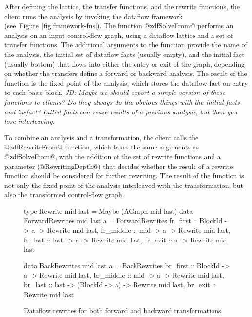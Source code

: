 \documentclass[blockstyle,preprint,nocopyrightspace]{sigplanconf}
\newcommand{\authornote}[1]{{\em #1}}
\newcommand{\john}[1]{\authornote{JD: #1}}
\newcommand\figref[1]{Figure~\ref{fig:#1}}
\newcommand\figlabel[1]{\label{fig:#1}}
\begin{document}
After defining the lattice, the transfer functions, and the rewrite functions,
the client runs the analysis by invoking the dataflow framework
(see~\figref{framework-fns}).
The function @zdfSolveFrom@ performs an analysis on an input control-flow graph,
using a dataflow lattice and a set of transfer functions.
The additional arguments to the function provide
the name of the analysis,
the initial set of dataflow facts (usually empty),
and the initial fact (usually bottom)
that flows into either the entry or exit of the graph,
depending on whether the transfers define a forward or backward analysis.
The result of the function is the fixed point of the analysis,
which stores the dataflow fact on entry to each basic block.
\john{Maybe we should export a simple version of these functions to clients?
  Do they always do the obvious things with the initial facts and in-fact?
  Initial facts can reuse results of a previous analysis, but then you lose
  interleaving.}

To combine an analysis and a transformation,
the client calls the @zdfRewriteFrom@ function,
which takes the same arguments as @zdfSolveFrom@,
with the addition of the set of rewrite functions
and a parameter (@RewritingDepth@) that decides whether the result
of a rewrite function should be considered for further rewriting.
The result of the function is not only the fixed point of the
analysis interleaved with the transformation,
but also the transformed control-flow graph.

\begin{figure}
\begin{code}
type Rewrite mid last = Maybe (AGraph mid last)
data ForwardRewrites mid last a = ForwardRewrites
 {fr_first  :: BlockId -> a -> Rewrite mid last,
  fr_middle :: mid     -> a -> Rewrite mid last,
  fr_last   :: last    -> a -> Rewrite mid last,
  fr_exit   ::            a -> Rewrite mid last} 

data BackRewrites mid last a = BackRewrites
 {br_first  :: BlockId  -> a  -> Rewrite mid last,
  br_middle :: mid      -> a  -> Rewrite mid last,
  br_last   :: last ->
               (BlockId -> a) -> Rewrite mid last,
  br_exit   ::                   Rewrite mid last} 
\end{code}
\caption{Dataflow rewrites for both forward and backward transformations.}
\figlabel{rewrites}
\end{figure}
\end{document}
